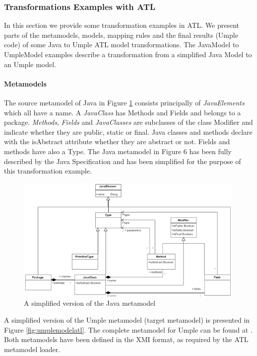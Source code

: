 \subsubsection{Transformations Examples with ATL}
\label{subsubsec:exampleATL}

In this section we provide some transformation examples in ATL. We present parts of the metamodels, models, mapping rules and the final results (Umple code) of some Java to Umple ATL model transformations.
The JavaModel to UmpleModel examples describe a transformation from a simplified Java Model to an Umple model. 

\paragraph{Metamodels} 

The source metamodel of Java in Figure \ref{fig:javamodelatl} consists principally of \textit{JavaElements} which all have a name. A \textit{JavaClass} has Methods and Fields and belongs to a package. \textit{Methods}, \textit{Fields} and \textit{JavaClasses} are subclasses of the class Modifier and indicate whether they are public, static or final. Java classes and methods declare with the isAbstract attribute whether they are abstract or not. Fields and methods have also a Type. The Java metamodel in Figure 6 has been fully described by the Java Specification \cite{javaSpec} and has been simplified for the purpose of this transformation example.

\begin{figure}[H]
\centering
\includegraphics[width=0.99\textwidth]{Figures/javametamodel.png} 
\caption{A simplified version of the Java metamodel}
\label{fig:javamodelatl}
\end{figure}

A simplified version of the Umple metamodel (target metamodel) is presented in Figure \ref{fig:umplemodelatl}. The complete metamodel for Umple can be found at \cite{UmpleMetamodel}. Both metamodels have been defined in the XMI format, as required by the ATL metamodel loader.

